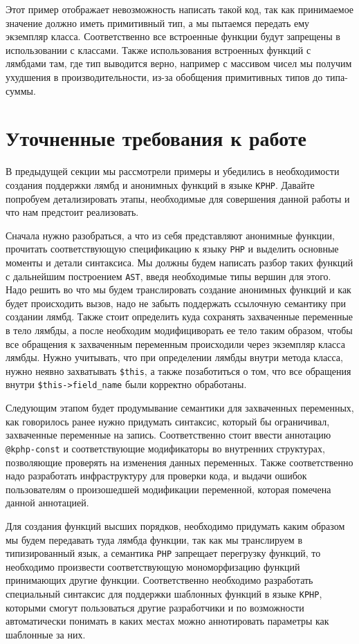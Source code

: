 Этот пример отображает невозможность написать такой код, так как принимаемое значение должно иметь примитивный тип, а мы пытаемся передать ему экземпляр класса.
Соответственно все встроенные функции будут запрещены в использовании с классами.
Также использования встроенных функций с лямбдами там, где тип выводится верно, например с массивом чисел мы получим ухудшения в производительности, из-за обобщения примитивных типов до типа-суммы.


\section{Уточненные требования к работе}
В предыдущей секции мы рассмотрели примеры и убедились в необходимости создания поддержки лямбд и анонимных функций в языке \verb|KPHP|. Давайте попробуем детализировать этапы, необходимые для совершения данной работы и что нам предстоит реализовать.

Сначала нужно разобраться, а что из себя представляют анонимные функции, прочитать соответствующую спецификацию к языку \verb|PHP| и выделить основные моменты и детали синтаксиса.
Мы должны будем написать разбор таких функций с дальнейшим построением \verb|AST|, введя необходимые типы вершин для этого.
Надо решить во что мы будем транслировать создание анонимных функций и как будет происходить вызов, надо не забыть поддержать ссылочную семантику при создании лямбд.
Также стоит определить куда сохранять захваченные переменные в тело лямбды, а после необходим модифициворать ее тело таким образом, чтобы все обращения к захваченным переменным происходили через экземпляр класса лямбды.
Нужно учитывать, что при определении лямбды внутри метода класса, нужно неявно захватывать \verb|$this|, а также позаботиться о том, что все обращения внутри \verb|$this->field_name| были корректно обработаны.

Следующим этапом будет продумывание семантики для захваченных переменных, как говорилось ранее нужно придумать синтаксис, который бы ограничивал, захваченные переменные на запись.
Соответственно стоит ввести аннотацию \verb|@kphp-const| и соответствующие модификаторы во внутренних структурах, позволяющие проверять на изменения данных переменных.
Также соответственно надо разработать инфраструктуру для проверки кода, и выдачи ошибок пользователям о произошедшей модификации переменной, которая помечена данной аннотацией.

Для создания функций высших порядков, необходимо придумать каким образом мы будем передавать туда лямбда функции, так как мы транслируем в типизированный язык, а семантика \verb|PHP| запрещает перегрузку функций, то необходимо произвести соответствующую мономорфизацию функций принимающих другие функции.
Соответственно необходимо разработать специальный синтаксис для поддержки шаблонных функций в языке \verb|KPHP|, которыми смогут пользоваться другие разработчики и по возможности автоматически понимать в каких местах можно аннотировать параметры как шаблонные за них.


